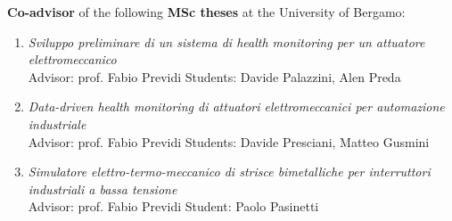 \documentclass[10pt]{article}
\begin{document}
\vspace{6pt} %

\textbf{Co-advisor} of the following \textbf{MSc theses} at the University of Bergamo:
\begin{enumerate}
	\setlength\itemsep{-3pt}
	\item \textit{Sviluppo preliminare di un sistema di health monitoring per un attuatore elettromeccanico}\\
	Advisor: prof. Fabio Previdi \hfill Students: Davide Palazzini, Alen Preda
	\item \textit{Data-driven health monitoring di attuatori elettromeccanici per automazione industriale}\\
	Advisor: prof. Fabio Previdi \hfill Students: Davide Presciani, Matteo Gusmini
	\item \textit{Simulatore elettro-termo-meccanico di strisce bimetalliche per interruttori industriali a bassa tensione}\\
	Advisor: prof. Fabio Previdi \hfill Student: Paolo Pasinetti
\end{enumerate}
\end{document}
